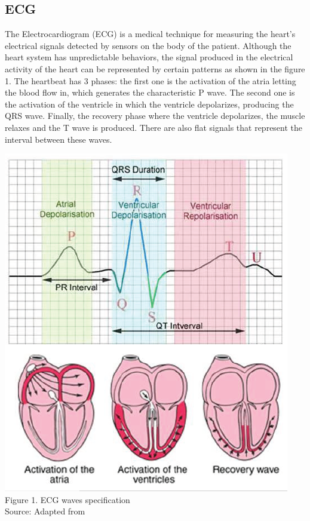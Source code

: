 \subsection{ECG}
The Electrocardiogram (ECG) is a medical technique for measuring the heart's electrical signals detected by sensors on the body of the patient. Although the heart system has unpredictable behaviors, the signal produced in the electrical activity of the heart can be represented by certain patterns  as shown in the figure 1. The heartbeat has 3 phases: the first one is the activation of the atria letting the blood flow in, which generates the characteristic P wave. The second one is the activation of the ventricle in which the ventricle depolarizes, producing the QRS wave. Finally, the recovery phase where the ventricle depolarizes, the muscle relaxes  and the T wave is produced. There are also flat signals that represent the interval between these waves. 
\begin{center}
\includegraphics[scale=0.5]{images/ECG.png}
\\Figure 1. ECG waves specification
\\Source: Adapted from \cite{ECGEventB}
\end{center}


